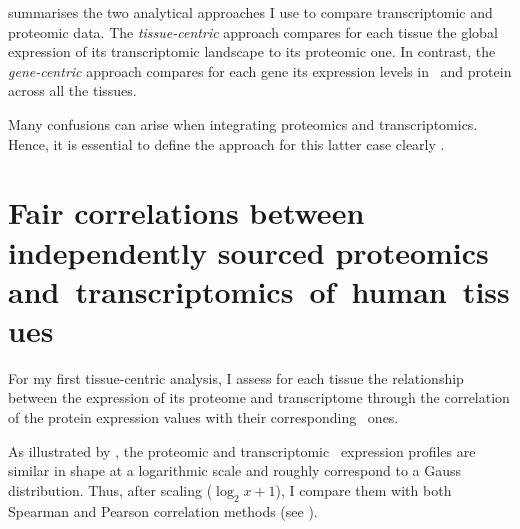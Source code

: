  summarises the two analytical approaches I use
to compare transcriptomic and proteomic data.
The \emph{tissue-centric} approach compares for each tissue
the global expression of its transcriptomic landscape to its proteomic one.
In contrast,
the \emph{gene-centric} approach compares for each gene
its expression levels in \mRNA\ and protein across all the tissues.

\begin{comment}
Although not explicitly indicated,
I use both tissue-centric and gene-centric approaches
in \Cref{ch:Transcriptomics,ch:proteomics}.
The \mRNAs\ studies are equivalent enough and
the proteomic studies so disparate that
global understanding remains unaffected without any precision.

On the other hand,
\end{comment}
Many confusions can arise
when integrating proteomics and transcriptomics.
Hence, it is essential
to define the approach for this latter case clearly .


\section{Fair correlations between independently sourced proteomics~%
and~transcriptomics~of~human~tissues~}\label{subsec:IntegrationGoodCorrProtTrans}

For my first tissue-centric analysis,
I assess for each tissue the relationship between
the expression of its proteome and transcriptome
through the correlation of the protein expression values
with their corresponding \mRNA\ ones.\\
\vspace{-\baselineskip}

As illustrated by ,
the proteomic and transcriptomic \treps\ expression profiles are similar
in shape at a logarithmic scale
and roughly correspond to a Gauss distribution.
Thus, after scaling ($\log_2{x+1}$),
I compare them with both Spearman and Pearson correlation methods
(see ).\\
\vspace{-\baselineskip}

